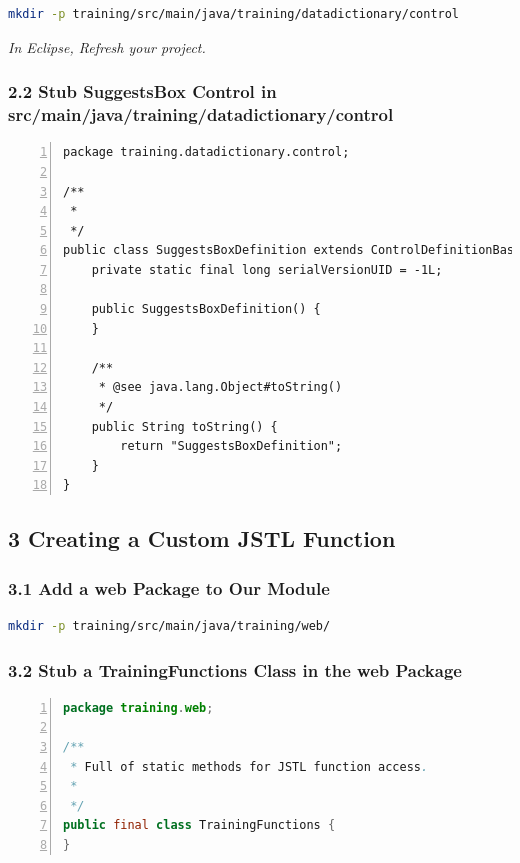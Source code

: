 \begin{lstlisting}[basicstyle=\scriptsize,language=bash,backgroundcolor=\color{ubergray},caption={Directory creation for Linux
    users},frame=single,breaklines=true]
  mkdir -p training/src/main/java/training/datadictionary/control
\end{lstlisting}

\emph{In Eclipse, Refresh your project.}

\subsubsection*{2.2 Stub SuggestsBox Control in src/main/java/training/datadictionary/control}
\begin{lstlisting}[basicstyle=\scriptsize,numbers=left,language=xml,backgroundcolor=\color{ubergray},caption={Stubbed
  OJB Descriptor file src/main/resources/OJB-repository-training.xml},frame=single,breaklines=true]
package training.datadictionary.control;

/**
 *
 */
public class SuggestsBoxDefinition extends ControlDefinitionBase {
    private static final long serialVersionUID = -1L;

	public SuggestsBoxDefinition() {
    }

    /**
     * @see java.lang.Object#toString()
     */
    public String toString() {
        return "SuggestsBoxDefinition";
    }
}
\end{lstlisting}

\subsection*{3 Creating a Custom JSTL Function}
\subsubsection*{3.1 Add a web Package to Our Module}

\begin{lstlisting}[basicstyle=\scriptsize,language=bash,backgroundcolor=\color{ubergray},caption={Directory creation for Linux
    users},frame=single,breaklines=true]
  mkdir -p training/src/main/java/training/web/
\end{lstlisting}

\subsubsection*{3.2 Stub a TrainingFunctions Class in the web
  Package}
\begin{lstlisting}[basicstyle=\scriptsize,numbers=left,language=java,backgroundcolor=\color{ubergray},caption={training/web/TrainingFunctions},frame=single,breaklines=true]
package training.web;

/**
 * Full of static methods for JSTL function access.
 * 
 */
public final class TrainingFunctions {
}
\end{lstlisting}

